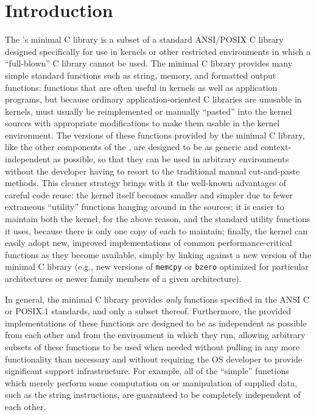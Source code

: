 %
% 
%
\label{libc}

\section{Introduction}

The \oskit{}'s minimal C library
is a subset of a standard ANSI/POSIX C library 
designed specifically for use in kernels or other restricted environments
in which a ``full-blown'' C library cannot be used.
The minimal C library provides many simple standard functions
such as string, memory, and formatted output functions:
functions that are often useful in kernels as well as application programs,
but because ordinary application-oriented C libraries are unusable in kernels,
must usually be reimplemented or manually ``pasted'' into the kernel sources
with appropriate modifications to make them usable in the kernel environment.
The versions of these functions provided by the \oskit{} minimal C library,
like the other components of the \oskit{},
are designed to be as generic and context-independent as possible,
so that they can be used in arbitrary environments
without the developer having to resort to
the traditional manual cut-and-paste methods.
This cleaner strategy brings with it
the well-known advantages of careful code reuse:
the kernel itself becomes smaller and simpler
due to fewer extraneous ``utility'' functions hanging around in the sources;
it is easier to maintain both the kernel, for the above reason,
and the standard utility functions it uses,
because there is only one copy of each to maintain;
finally, the kernel can easily adopt new, improved implementations
of common performance-critical functions as they become available,
simply by linking against a new version of the minimal C library
(e.g., new versions of {\tt memcpy} or {\tt bzero}
optimized for particular architectures
or newer family members of a given architecture).

In general,
the minimal C library provides \emph{only} functions
specified in the ANSI C or POSIX.1 standards,
and only a subset thereof.
Furthermore, the provided implementations of these functions
are designed to be as independent as possible
from each other and from the environment in which they run,
allowing arbitrary subsets of these functions to be used when needed
without pulling in any more functionality than necessary
and without requiring the OS developer
to provide significant support infrastructure.
For example, all of the ``simple'' functions
which merely perform some computation on or manipulation of supplied data,
such as the string instructions,
are guaranteed to be completely independent of each other.

